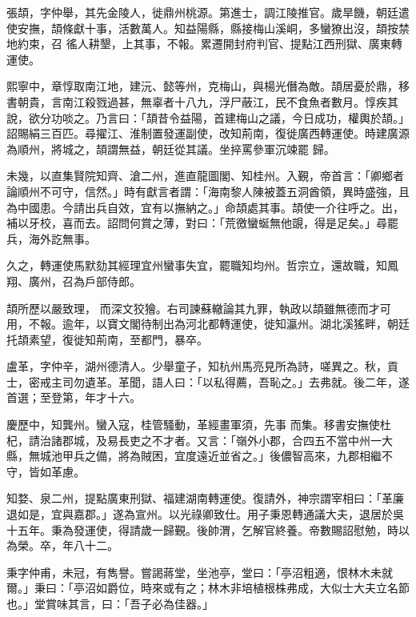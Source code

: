 \begin{pinyinscope}
 張頡，字仲舉，其先金陵人，徙鼎州桃源。第進士，調江陵推官。歲旱饑，朝廷遣使安撫，頡條獻十事，活數萬人。知益陽縣，縣接梅山溪峒，多蠻獠出沒，頡按禁地約束，召
 徭人耕墾，上其事，不報。累遷開封府判官、提點江西刑獄、廣東轉運使。



 熙寧中，章惇取南江地，建沅、懿等州，克梅山，與楊光僭為敵。頡居憂於鼎，移書朝貴，言南江殺戮過甚，無辜者十八九，浮尸蔽江，民不食魚者數月。惇疾其說，欲分功啖之。乃言曰：「頡昔令益陽，首建梅山之議，今日成功，權輿於頡。」詔賜絹三百匹。尋擢江、淮制置發運副使，改知荊南，復徙廣西轉運使。時建廣源為順州，將城之，頡謂無益，朝廷從其議。坐捽罵參軍沉竦罷
 歸。



 未幾，以直集賢院知齊、滄二州，進直龍圖閣、知桂州。入覲，帝首言：「卿鄉者論順州不可守，信然。」時有獻言者謂：「海南黎人陳被蓋五洞酋領，異時盛強，且為中國患。今請出兵自效，宜有以撫納之。」命頡處其事。頡使一介往呼之。出，補以牙校，喜而去。詔問何賞之薄，對曰：「荒徼蠻蜒無他覬，得是足矣。」尋罷兵，海外訖無事。



 久之，轉運使馬默劾其經理宜州蠻事失宜，罷職知均州。哲宗立，還故職，知鳳翔、廣州，召為戶部侍郎。



 頡所歷以嚴致理，
 而深文狡獪。右司諫蘇轍論其九罪，執政以頡雖無德而才可用，不報。逾年，以寶文閣待制出為河北都轉運使，徙知瀛州。湖北溪猺畔，朝廷托頡素望，復徙知荊南，至都門，暴卒。



 盧革，字仲辛，湖州德清人。少舉童子，知杭州馬亮見所為詩，嗟異之。秋，貢士，密戒主司勿遺革。革聞，語人曰：「以私得薦，吾恥之。」去弗就。後二年，遂首選；至登第，年才十六。



 慶歷中，知龔州。蠻入寇，桂管騷動，革經畫軍須，先事
 而集。移書安撫使杜杞，請治諸郡城，及易長吏之不才者。又言：「嶺外小郡，合四五不當中州一大縣，無城池甲兵之備，將為賊困，宜度遠近並省之。」後儂智高來，九郡相繼不守，皆如革慮。



 知婺、泉二州，提點廣東刑獄、福建湖南轉運使。復請外，神宗謂宰相曰：「革廉退如是，宜與嘉郡。」遂為宣州。以光祿卿致仕。用子秉恩轉通議大夫，退居於吳十五年。秉為發運使，得請歲一歸覲。後帥渭，乞解官終養。帝數賜詔慰勉，時以為榮。卒，年八十二。



 秉字仲甫，未冠，有雋譽。嘗謁蔣堂，坐池亭，堂曰：「亭沼粗適，恨林木未就爾。」秉曰：「亭沼如爵位，時來或有之；林木非培植根株弗成，大似士大夫立名節也。」堂賞味其言，曰：「吾子必為佳器。」




\end{pinyinscope}
